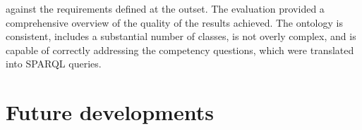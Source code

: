 against the requirements defined at the outset. The evaluation provided a comprehensive overview of the quality of the results achieved. The ontology is consistent, includes a substantial number of classes, is not overly complex, and is capable of correctly addressing the competency questions, which were translated into SPARQL queries.





\section{Future developments}

